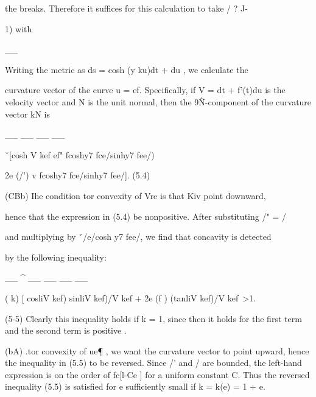 the breaks. Therefore it suffices for this calculation to take / ? J-{   1) with

__

Writing the metric as ds   = cosh (y   ku)dt + du , we calculate the

curvature vector of the curve u = ef. Specifically, if V = dt + f'(t)du is
the velocity vector and N is the unit normal, then the 9Ñ-component of the
curvature vector kN is

__                                                                                                                                                                                                      __                                                                                                                         __                                                                                                                                                             __

\v\    [cosh V kef ef"    \J  fcoshy7  fce/sinhy7  fee/)

2e (/') v   fcoshy7  fce/sinhy7  fee/].   (5.4)

(CBb) Ihe condition tor convexity of Vre   is that Kiv point downward,

hence that the expression in (5.4) be nonpositive. After substituting /" = /

and multiplying by \v\ /e/cosh y7  fee/, we find that concavity is detected

by the following inequality:

__       ^      __        __                                                                                                                                                                                                                                                                                                                              __       __

(  k) [ cosliV  kef) sinliV  kef)/V  kef + 2e (f ) (tanliV  kef)/V  kef\ >1.

(5-5)
Clearly this inequality holds if k =    1, since then it holds for the first
term and the second term is positive .

(bA) .tor convexity of ue¶ , we want the curvature vector to point
upward, hence the inequality in (5.5) to be reversed. Since /' and / are
bounded, the left-hand expression is on the order of fc[l-\-Ce ] for a uniform
constant C. Thus the reversed inequality (5.5) is satisfied for e sufficiently
small if k = k(e) =   1 + e.

}
